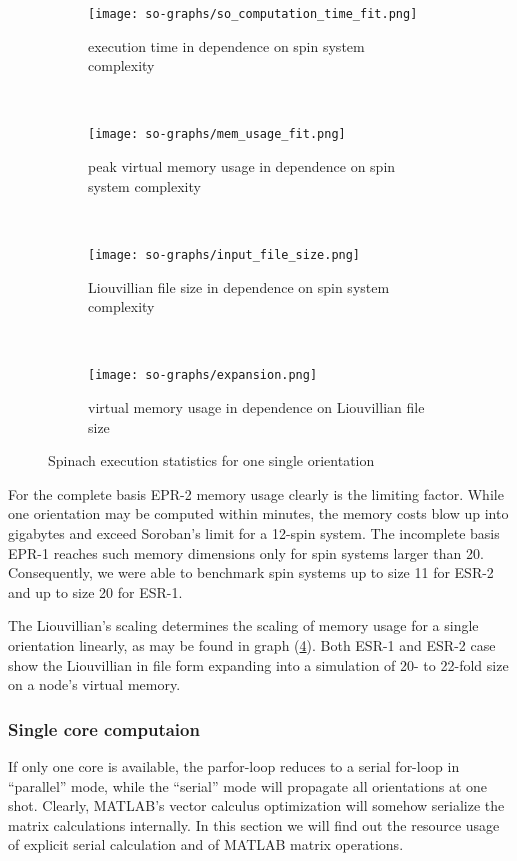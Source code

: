 \documentclass[11.5pt,a4paper]{article}
\begin{document}
\begin{figure}
        \begin{subfigure}[b]{0.45\textwidth}
                \centering
                \texttt{[image: so-graphs/so\_computation\_time\_fit.png]}
                \caption{execution time in dependence on spin system complexity}
                \label{fig-so-runtime}
        \end{subfigure}
        ~ 
        \begin{subfigure}[b]{0.45\textwidth}
                \centering
                \texttt{[image: so-graphs/mem\_usage\_fit.png]}
                \caption{peak virtual memory usage in dependence on spin system complexity}
                \label{fig-so-memory}
        \end{subfigure}
        \\
        \begin{subfigure}[b]{0.45\textwidth}
                \centering
                \texttt{[image: so-graphs/input\_file\_size.png]}
                \caption{Liouvillian file size in dependence on spin system complexity}
                \label{fig-so-file-size}
        \end{subfigure}
	~ 
	\begin{subfigure}[b]{0.45\textwidth}
                \centering
                \texttt{[image: so-graphs/expansion.png]}
                \caption{virtual memory usage in dependence on Liouvillian file size}
                \label{fig-so-expansion}
        \end{subfigure}
        \caption{Spinach execution statistics for one single orientation}
	\label{fig-so-stats}
\end{figure}

For the complete basis EPR-2 memory usage clearly is the limiting factor. While one orientation may be computed within minutes, the memory costs blow up into gigabytes and exceed Soroban's limit for a 12-spin system. The incomplete basis EPR-1 reaches such memory dimensions only for spin systems larger than 20. Consequently, we were able to benchmark spin systems up to size 11 for ESR-2 and up to size 20 for ESR-1. 

The Liouvillian's scaling determines the scaling of memory usage for a single orientation linearly, as may be found in graph (\ref{fig-so-expansion}). Both ESR-1 and ESR-2 case show the Liouvillian in file form expanding into a simulation of 20- to 22-fold size on a node's virtual memory.

\subsubsection{Single core computaion}
If only one core is available, the parfor-loop reduces to a serial for-loop in ``parallel'' mode, while the ``serial'' mode will propagate all orientations at one shot. Clearly, MATLAB's vector calculus optimization will somehow serialize the matrix calculations internally. In this section we will find out the resource usage of explicit serial calculation and of MATLAB matrix operations.
\end{document}
